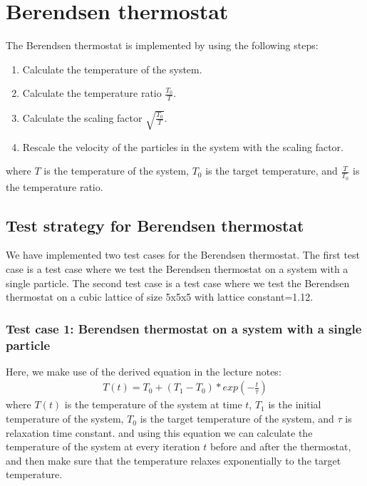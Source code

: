 \section{Berendsen thermostat}
    The Berendsen thermostat is implemented by using the following steps:
    \begin{enumerate}
        \item Calculate the temperature of the system.
        \item Calculate the temperature ratio $\frac{T_0}{T}$.
        \item Calculate the scaling factor $\sqrt{\frac{T_0}{T}}$.
        \item Rescale the velocity of the particles in the system with the scaling factor.
    \end{enumerate}
    where $T$ is the temperature of the system, $T_0$ is the target temperature, and $\frac{T}{T_0}$ is the temperature ratio.


    \subsection{Test strategy for Berendsen thermostat}
    We have implemented two test cases for the Berendsen thermostat. The first test case is a test case where we test the Berendsen thermostat on a system with a single particle. The second test case is a test case where we test the Berendsen thermostat on a cubic lattice of size 5x5x5 with lattice constant=1.12.

    \subsubsection{Test case 1: Berendsen thermostat on a system with a single particle}
    Here, we make use of the derived equation in the lecture notes\cite{molDymCourse}:
    \begin{equation}
    \label{eq:berendsen}
        \begin{aligned}
            T(t) = T_0 + (T_1-T_0)*{exp(-\frac{t}{\tau})}
        \end{aligned}
    \end{equation}
    where $T(t)$ is the temperature of the system at time $t$, $T_1$ is the initial temperature of the system, $T_0$ is the target temperature of the system, and $\tau$ is relaxation time constant. and using this equation we can calculate the temperature of the system at every iteration $t$ before and after the thermostat, and then make sure that the temperature relaxes exponentially to the target temperature.

